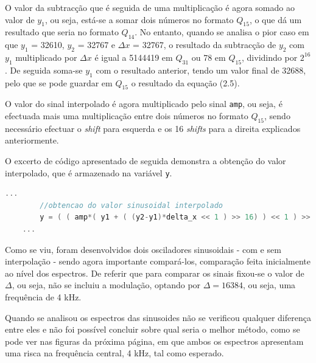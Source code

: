 \documentclass[11pt]{article}
\numberwithin{equation}{section}
\begin{document}
O valor da subtracção que é seguida de uma multiplicação é agora somado ao valor de $y_1$, ou seja, está-se a somar dois números no formato $Q_{15}$, o que dá um resultado que seria no formato $Q_{14}$. No entanto, quando se analisa o pior caso em que $y_1$ = 32610, $y_2$ = 32767 e $\Delta x$ = 32767, o resultado da subtracção de $y_2$ com $y_1$ multiplicado por $\Delta x$ é igual a 5144419 em $Q_{31}$ ou 78 em $Q_{15}$, dividindo por $2^{16}$. De seguida soma-se $y_1$ com o resultado anterior, tendo um valor final de 32688, pelo que se pode guardar em $Q_{15}$ o resultado da equação (2.5).

O valor do sinal interpolado é agora multiplicado pelo sinal \texttt{amp}, ou seja, é efectuada mais uma multiplicação entre dois números no formato $Q_{15}$, sendo necessário efectuar o \textit{shift} para esquerda e os 16 \textit{shifts} para a direita explicados anteriormente.

O excerto de código apresentado de seguida demonstra a obtenção do valor interpolado, que é armazenado na variável \texttt{y}. 

\begin{lstlisting}[language=C]
	...
		//obtencao do valor sinusoidal interpolado 
		y = ( ( amp*( y1 + ( (y2-y1)*delta_x << 1 ) >> 16) ) << 1 ) >> 16);
	...
\end{lstlisting}

Como se viu, foram desenvolvidos dois osciladores sinusoidais - com e sem interpolação - sendo agora importante compará-los, comparação feita inicialmente ao nível dos espectros. De referir que para comparar os sinais fixou-se o valor de $\Delta$, ou seja, não se incluiu a modulação, optando por $\Delta = 16384$, ou seja, uma frequência de 4 kHz. 

Quando se analisou os espectros das sinusoides não se verificou qualquer diferença entre eles e não foi possível concluir sobre qual seria o melhor método, como se pode ver nas figuras da próxima página, em que ambos os espectros apresentam uma risca na frequência central, 4 kHz, tal como esperado.
\end{document}
